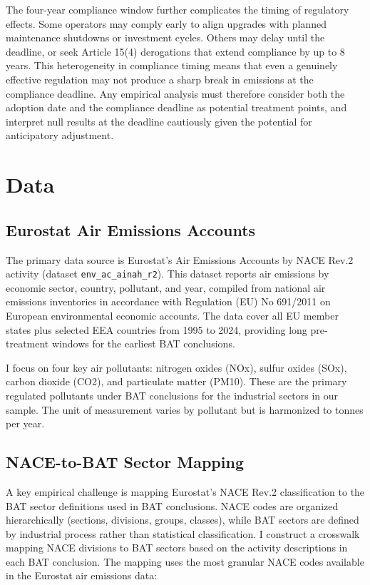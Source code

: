 \documentclass[12pt]{article}
\begin{document}
The four-year compliance window further complicates the timing of regulatory effects. Some operators may comply early to align upgrades with planned maintenance shutdowns or investment cycles. Others may delay until the deadline, or seek Article 15(4) derogations that extend compliance by up to 8 years. This heterogeneity in compliance timing means that even a genuinely effective regulation may not produce a sharp break in emissions at the compliance deadline. Any empirical analysis must therefore consider both the adoption date and the compliance deadline as potential treatment points, and interpret null results at the deadline cautiously given the potential for anticipatory adjustment.


\section{Data}

\subsection{Eurostat Air Emissions Accounts}

The primary data source is Eurostat's Air Emissions Accounts by NACE Rev.2 activity (dataset \texttt{env\_ac\_ainah\_r2}). This dataset reports air emissions by economic sector, country, pollutant, and year, compiled from national air emissions inventories in accordance with Regulation (EU) No 691/2011 on European environmental economic accounts. The data cover all EU member states plus selected EEA countries from 1995 to 2024, providing long pre-treatment windows for the earliest BAT conclusions.

I focus on four key air pollutants: nitrogen oxides (NOx), sulfur oxides (SOx), carbon dioxide (CO2), and particulate matter (PM10). These are the primary regulated pollutants under BAT conclusions for the industrial sectors in our sample. The unit of measurement varies by pollutant but is harmonized to tonnes per year.

\subsection{NACE-to-BAT Sector Mapping}

A key empirical challenge is mapping Eurostat's NACE Rev.2 classification to the BAT sector definitions used in BAT conclusions. NACE codes are organized hierarchically (sections, divisions, groups, classes), while BAT sectors are defined by industrial process rather than statistical classification. I construct a crosswalk mapping NACE divisions to BAT sectors based on the activity descriptions in each BAT conclusion. The mapping uses the most granular NACE codes available in the Eurostat air emissions data:
\end{document}
